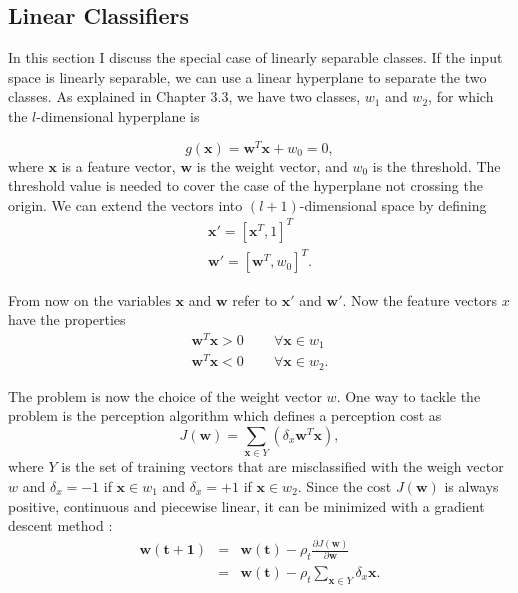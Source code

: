 


\subsection{Linear Classifiers}
In this section I discuss the special case of linearly separable classes. If the input space is linearly separable, we can use a linear hyperplane to separate the two classes. \cite{tappen10} As explained in Chapter 3.3, we have two classes, $w_1$ and $w_2$, for which the $l$-dimensional hyperplane is

\begin{equation}
g(\mathbf{x}) = \mathbf{w}^T \mathbf{x} + w_0 = 0,
\end{equation}
where $\mathbf{x}$ is a feature vector, $\mathbf{w}$ is the weight vector, and $w_0$ is the threshold. The threshold value is needed to cover the case of the hyperplane not crossing the origin. We can extend the vectors into $(l+1)$-dimensional space by defining
\begin{eqnarray}
\mathbf{x'} = \left [ \mathbf{x}^T, 1 \right ]^T \\
\mathbf{w'} = \left [ \mathbf{w}^T, w_0 \right ]^T.
\end{eqnarray}

From now on the variables $\mathbf{x}$ and $\mathbf{w}$ refer to $\mathbf{x'}$ and $\mathbf{w'}$. Now the feature vectors $x$ have the properties
\begin{eqnarray}
\mathbf{w}^T \mathbf{x} > 0 &\;\;& \forall \mathbf{x} \in w_1 \\
\mathbf{w}^T \mathbf{x} < 0 &\;\;& \forall \mathbf{x} \in w_2.
\end{eqnarray}

The problem is now the choice of the weight vector $w$. One way to tackle the problem is the perception algorithm which defines a perception cost as
\begin{equation}
J(\mathbf{w}) = \sum_{\mathbf{x} \in Y} (\delta_x \mathbf{w}^T \mathbf{x}),
\end{equation}
where $Y$ is the set of training vectors that are misclassified with the weigh vector $w$ and $\delta_x = -1$ if $\mathbf{x} \in w_1$ and $\delta_x = +1$ if $\mathbf{x} \in w_2$. Since the cost $J(\mathbf{w})$ is always positive, continuous and piecewise linear, it can be minimized with a gradient descent method \cite{tappen10}:
\begin{eqnarray}
\mathbf{w(t+1)} &=& \mathbf{w(t)} - \rho_t \frac{\partial J(\mathbf{w})}{\partial \mathbf{w}} \\
&=& \mathbf{w(t)} - \rho_t \sum_{\mathbf{x} \in Y} \delta_x \mathbf{x}.
\end{eqnarray}

